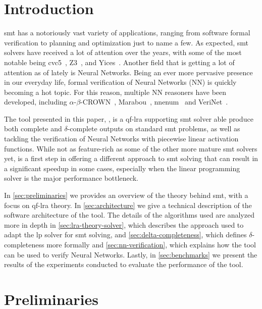 \documentclass[runningheads]{llncs}
\begin{document}
\section{Introduction}

\gls{smt} has a notoriously vast variety of applications, ranging from software formal verification to planning and optimization just to name a few.
As expected, \gls{smt} solvers have received a lot of attention over the years, with some of the most notable being cvc5~\cite{ref:cvc5}, Z3~\cite{ref:z3}, and Yices~\cite{ref:yices}.
Another field that is getting a lot of attention as of lately is Neural Networks.
Being an ever more pervasive presence in our everyday life, formal verification of Neural Networks (NN) is quickly becoming a hot topic.
For this reason, multiple NN reasoners have been developed, including $\alpha$-$\beta$-CROWN~\cite{ref:a-crown,ref:b-crown,ref:crown,ref:lirpa}, Marabou~\cite{ref:marabou}, nnenum~\cite{ref:nnenum} and VeriNet~\cite{ref:verinet}.

The tool presented in this paper, \dlinear, is a \gls{qf-lra} supporting \gls{smt} solver able produce both complete and $\delta$-complete outputs on standard \gls{smt} problems,
as well as tackling the verification of Neural Networks with piecewise linear activation functions.
While not as feature-rich as some of the other more mature \gls{smt} solvers yet, \dlinear is a first step in offering a different approach to \gls{smt} solving that can result in a significant speedup in some cases, especially when the linear programming solver is the major performance bottleneck.

In \autoref{sec:preliminaries} we provides an overview of the theory behind \gls{smt}, with a focus on \gls{qf-lra} theory.
In \autoref{sec:architecture} we give a technical description of the software architecture of the tool.
The details of the algorithms used are analyzed more in depth in \autoref{sec:lra-theory-solver}, which describes the approach used to adapt the \gls{lp} solver for \gls{smt} solving, and \autoref{sec:delta-completeness}, which defines $\delta$-completeness more formally and \autoref{sec:nn-verification}, which explains how the tool can be used to verify Neural Networks.
Lastly, in \autoref{sec:benchmarks} we present the results of the experiments conducted to evaluate the performance of the tool.

\section{Preliminaries}
\label{sec:preliminaries}
\end{document}
